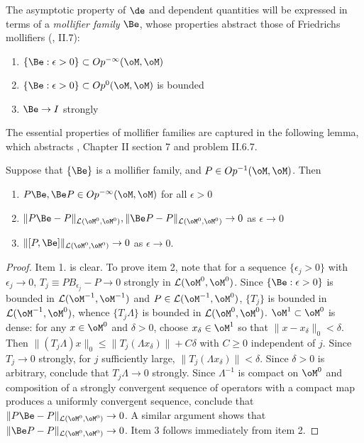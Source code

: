 
The asymptotic property of $\de$ and dependent quantities will be
expressed in terms of a {\em mollifier family} $\Be$, whose
properties abstract those of Friedrichs mollifiers (\cite{Tay:81},
II.7):
\begin{enumerate}
\item $\{\Be:\epsilon>0\} \subset Op^{-\infty}(\oM,\oM)$ 
\item $\{\Be:\epsilon>0\} \subset Op^0(\oM,\oM)$ is bounded 
\item $\Be \rightarrow I$ strongly
\end{enumerate}

The essential properties of mollifier families are captured in the
following lemma, which abstracts \cite{Tay:81},
Chapter II section 7 and 
problem II.6.7.

\begin{lem}\label{lem:moll} Suppose that $\{\Be\}$ is a mollifier family,
and $P \in Op^{-1}(\oM,\oM)$. Then
\begin{enumerate}
\item $P\Be, \Be P \in Op^{-\infty}(\oM,\oM)$ for all
  $\epsilon > 0$
\item $\|P\Be - P\|_{{\cal L}(\oM^0,\oM^0)}, \|\Be P-P\|_{{\cal L}(\oM^0,\oM^0)} \rightarrow 0$ as
$\epsilon \rightarrow 0$  
\item $\|[P,\Be]\|_{{\cal L}(\oM^0,\oM^0)} \rightarrow 0$ as
  $\epsilon \rightarrow 0$.
\end{enumerate}
\end{lem}
\begin{proof}
Item 1. is clear. To prove item 2, note that for a sequence $\{\epsilon_j >0\}$ with
$\epsilon_j \rightarrow 0$, $T_j \equiv PB_{\epsilon_j}-P \rightarrow
0$ strongly in ${\cal L}(\oM^0,\oM^0)$. Since $\{\Be:\epsilon > 0\}$
is bounded in ${\cal L}(\oM^{-1},\oM^{-1})$ and $P \in {\cal
  L}(\oM^{-1},\oM^{0})$, $\{T_j\}$ is bounded in ${\cal
  L}(\oM^{-1},\oM^{0})$, whence $\{T_j\Lambda\}$ is bounded in ${\cal
L}(\oM^0,\oM^0)$. $\oM^1 \subset \oM^0$ is dense: for any
$x \in \oM^0$ and $\delta > 0$, choose $x_{\delta} \in \oM^1$ so that
$\|x-x_{\delta}\|_0 < \delta$. Then $\|(T_j\Lambda)x\|_0 \le \|T_j
(\Lambda x_{\delta})\| + C\delta$ with $C \ge 0$ independent of
$j$. Since $T_j \rightarrow 0$ strongly, for $j$ sufficiently large, 
$\|T_j(\Lambda x_{\delta})\| < \delta$. Since $\delta > 0$ is
arbitrary, conclude that $T_j \Lambda \rightarrow 0$ strongly. Since
$\Lambda^{-1}$ is compact on $\oM^0$ and composition of a strongly
convergent sequence of operators with a compact map produces a uniformly convergent
sequence, conclude that $\|P\Be - P\|_{{\cal L}(\oM^0,\oM^0)}
\rightarrow 0$. A similar argument shows that  $\|\Be P - P\|_{{\cal L}(\oM^0,\oM^0)}
\rightarrow 0$. Item 3 follows immediately from item 2.
\end{proof}

